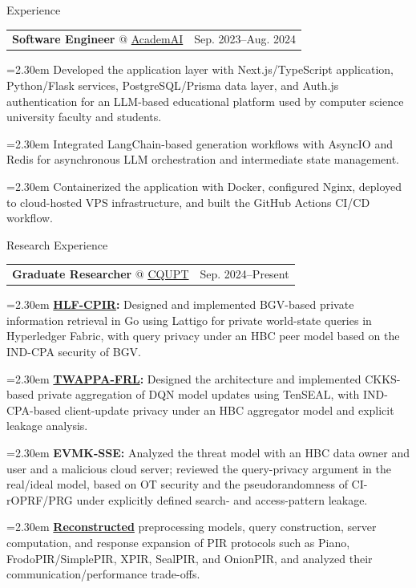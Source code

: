 \documentclass[11pt,a4paper]{article}
\makeatletter
\newcommand{\cvrow}[2]{%
  \noindent
  \begin{minipage}[t]{0.145\textwidth}
    \vspace{0pt}%
    \raggedright
    \fontsize{10.5}{12.5}\selectfont
    #1
  \end{minipage}%
  \hfill
  \begin{minipage}[t]{0.835\textwidth}
    \vspace{0pt}%
    #2
  \end{minipage}\par
}
\newcommand{\workentry}[2]{%
  \noindent
  \begin{tabularx}{\linewidth}
    {@{}X@{\hspace{0.8em}}r@{}}
    #1 & \small #2
  \end{tabularx}\par
  \vspace{0.15em}
}
\newcommand{\workproject}[1]{%
  \noindent
  \hangindent=2.30em
  \hangafter=1
  \hspace*{1.15em}\makebox[1.15em][l]{$\diamond$}#1\par
  \vspace{0.12em}
}
\makeatother
\begin{document}
\vspace{0.50em}

\cvrow{Experience}{%
  \workentry
    {\textbf{Software Engineer} @ \href{https://academai.ru/}{AcademAI}}
    {Sep. 2023--Aug. 2024}
  \workproject{Developed the application layer with Next.js/TypeScript application,
  Python/Flask services, PostgreSQL/Prisma data layer, and Auth.js authentication
  for an LLM-based educational platform used by computer science university faculty
  and students.}
  \workproject{Integrated LangChain-based generation workflows with AsyncIO and Redis for
  asynchronous LLM orchestration and intermediate state management.}
  \workproject{Containerized the application with Docker, configured Nginx, deployed
  to cloud-hosted VPS infrastructure, and built the GitHub Actions CI/CD workflow.}
}

\vspace{0.50em}

\cvrow{Research Experience}{%
  \workentry
    {\textbf{Graduate Researcher} @
    \href{https://www.cqupt.edu.cn/}{CQUPT}}
    {Sep. 2024--Present}

  \workproject{\textbf{\href{https://github.com/iasenovets/2_2_HLF_CPIR}{HLF-CPIR}:}
  Designed and implemented BGV-based private information retrieval in Go using
  Lattigo for private world-state queries in Hyperledger Fabric,
  with query privacy under an HBC peer model based on the IND-CPA security of BGV.}

  \workproject{\textbf{\href{https://github.com/hetiantian10/TWAPPA-FRL}{TWAPPA-FRL}:}
  Designed the architecture and implemented CKKS-based
  private aggregation of DQN model updates using TenSEAL, with IND-CPA-based
  client-update privacy under an HBC aggregator model and explicit leakage analysis.}

  \workproject{\textbf{EVMK-SSE:} Analyzed the threat model with an HBC data owner
  and user and a malicious cloud server; reviewed the query-privacy argument in the
  real/ideal model, based on OT security and the pseudorandomness of CI-rOPRF/PRG under explicitly
  defined search- and access-pattern leakage.}



  \workproject{\textbf{\href{https://iasenovets.github.io/pir-schemes}{Reconstructed}}
  preprocessing models, query construction, server computation, and response expansion of PIR
  protocols such as Piano, FrodoPIR/SimplePIR, XPIR, SealPIR, and OnionPIR, and
  analyzed their communication/performance trade-offs.}
}
\end{document}
